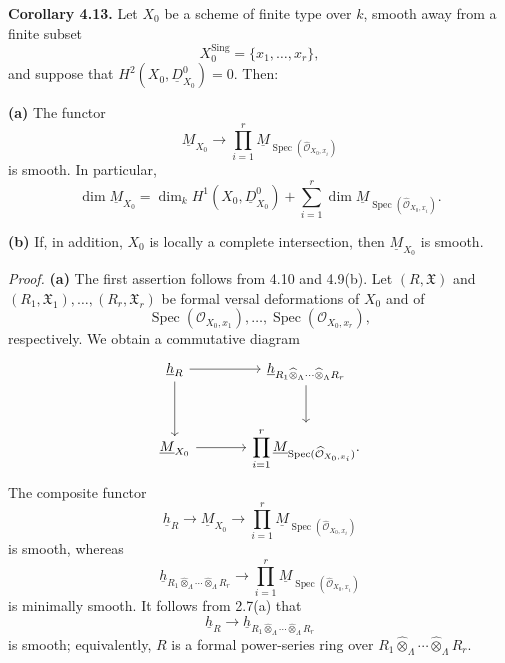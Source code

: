 \medskip
\noindent\textbf{Corollary 4.13.}
Let $X_0$ be a scheme of finite type over $k$, smooth away from a
finite subset
\[
X_0^{\mathrm{Sing}}=\{x_1,\ldots,x_r\},
\]
and suppose that $H^2(X_0,\underline D^0_{X_0})=0$. Then:

\smallskip
\noindent\textbf{(a)} The functor
\[
\underline M_{X_0}\longrightarrow
\prod_{i=1}^r
\underline M_{\operatorname{Spec}(\widehat{\mathcal O}_{X_0,x_i})}
\]
is smooth. In particular,
\[
\dim\underline M_{X_0}
=\dim_k H^1(X_0,\underline D^0_{X_0})
+\sum_{i=1}^r
\dim\underline M_{\operatorname{Spec}(\widehat{\mathcal O}_{X_0,x_i})}.
\]

\smallskip
\noindent\textbf{(b)} If, in addition, $X_0$ is locally a complete
intersection, then $\underline M_{X_0}$ is smooth.


\smallskip
\noindent\textit{Proof.}
\textbf{(a)} The first assertion follows from 4.10 and 4.9(b).
Let $(R,\mathfrak X)$ and
$(R_1,\mathfrak X_1),\ldots,(R_r,\mathfrak X_r)$ be formal versal
deformations of $X_0$ and of
\[
\operatorname{Spec}(\mathcal O_{X_0,x_1}),\ldots,
\operatorname{Spec}(\mathcal O_{X_0,x_r}),
\]
respectively. We obtain a commutative diagram
\[
\begin{tikzcd}[column sep=large,row sep=large]
\underline h_R
  \arrow[r]
  \arrow[d]
& \underline h_{R_1\widehat\otimes_\Lambda\cdots
  \widehat\otimes_\Lambda R_r}
  \arrow[d] \\
\underline M_{X_0}
  \arrow[r]
& \displaystyle\prod_{i=1}^r
  \underline M_{\operatorname{Spec}(\widehat{\mathcal O}_{X_0,x_i})}.
\end{tikzcd}
\]
The composite functor
\[
\underline h_R\longrightarrow\underline M_{X_0}
\longrightarrow
\prod_{i=1}^r
\underline M_{\operatorname{Spec}(\widehat{\mathcal O}_{X_0,x_i})}
\]
is smooth, whereas
\[
\underline h_{R_1\widehat\otimes_\Lambda\cdots
\widehat\otimes_\Lambda R_r}
\longrightarrow
\prod_{i=1}^r
\underline M_{\operatorname{Spec}(\widehat{\mathcal O}_{X_0,x_i})}
\]
is minimally smooth. It follows from 2.7(a) that
\[
\underline h_R\longrightarrow
\underline h_{R_1\widehat\otimes_\Lambda\cdots
\widehat\otimes_\Lambda R_r}
\]
is smooth; equivalently, $R$ is a formal power-series ring over
$R_1\widehat\otimes_\Lambda\cdots\widehat\otimes_\Lambda R_r$.

